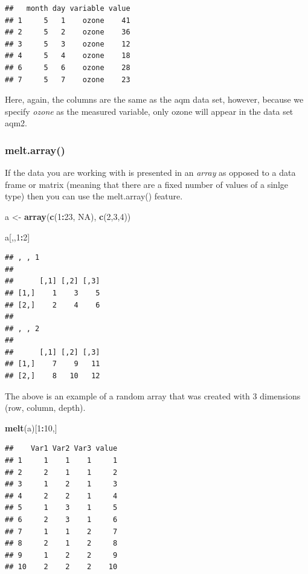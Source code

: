 \documentclass[]{book}
\newenvironment{Shaded}{\begin{snugshade}}{\end{snugshade}}
\newcommand{\DecValTok}[1]{\textcolor[rgb]{0.00,0.00,0.81}{#1}}
\newcommand{\KeywordTok}[1]{\textcolor[rgb]{0.13,0.29,0.53}{\textbf{#1}}}
\newcommand{\NormalTok}[1]{#1}
\newcommand{\OperatorTok}[1]{\textcolor[rgb]{0.81,0.36,0.00}{\textbf{#1}}}
\newcommand{\OtherTok}[1]{\textcolor[rgb]{0.56,0.35,0.01}{#1}}
\newcommand{\StringTok}[1]{\textcolor[rgb]{0.31,0.60,0.02}{#1}}
\begin{document}
\begin{verbatim}
##   month day variable value
## 1     5   1    ozone    41
## 2     5   2    ozone    36
## 3     5   3    ozone    12
## 4     5   4    ozone    18
## 6     5   6    ozone    28
## 7     5   7    ozone    23
\end{verbatim}

Here, again, the columns are the same as the aqm data set, however, because we specify \emph{ozone} as the measured variable, only ozone will appear in the data set aqm2.

\hypertarget{melt.array}{%
\subsubsection{melt.array()}\label{melt.array}}

If the data you are working with is presented in an \emph{array} as opposed to a data frame or matrix (meaning that there are a fixed number of values of a sinlge type) then you can use the melt.array() feature.

\begin{Shaded}
\begin{Highlighting}[]
\NormalTok{a <-}\StringTok{ }\KeywordTok{array}\NormalTok{(}\KeywordTok{c}\NormalTok{(}\DecValTok{1}\OperatorTok{:}\DecValTok{23}\NormalTok{, }\OtherTok{NA}\NormalTok{), }\KeywordTok{c}\NormalTok{(}\DecValTok{2}\NormalTok{,}\DecValTok{3}\NormalTok{,}\DecValTok{4}\NormalTok{))}

\NormalTok{a[,,}\DecValTok{1}\OperatorTok{:}\DecValTok{2}\NormalTok{]}
\end{Highlighting}
\end{Shaded}

\begin{verbatim}
## , , 1
## 
##      [,1] [,2] [,3]
## [1,]    1    3    5
## [2,]    2    4    6
## 
## , , 2
## 
##      [,1] [,2] [,3]
## [1,]    7    9   11
## [2,]    8   10   12
\end{verbatim}

The above is an example of a random array that was created with 3 dimensions (row, column, depth).

\begin{Shaded}
\begin{Highlighting}[]
\KeywordTok{melt}\NormalTok{(a)[}\DecValTok{1}\OperatorTok{:}\DecValTok{10}\NormalTok{,]}
\end{Highlighting}
\end{Shaded}

\begin{verbatim}
##    Var1 Var2 Var3 value
## 1     1    1    1     1
## 2     2    1    1     2
## 3     1    2    1     3
## 4     2    2    1     4
## 5     1    3    1     5
## 6     2    3    1     6
## 7     1    1    2     7
## 8     2    1    2     8
## 9     1    2    2     9
## 10    2    2    2    10
\end{verbatim}
\end{document}
